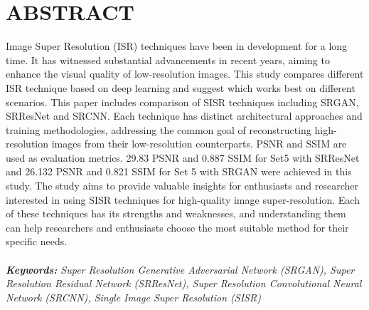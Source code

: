 \newpage

\section*{ABSTRACT}

Image Super Resolution (ISR) techniques have been in development for a long time. It has witnessed substantial advancements in recent years, aiming to enhance the visual quality of low-resolution images. This study compares different ISR technique based on deep learning and suggest which works best on different scenarios. This paper includes comparison of SISR techniques including SRGAN, SRResNet and SRCNN. Each technique has distinct architectural approaches and training methodologies, addressing the common goal of reconstructing high-resolution images from their low-resolution counterparts. PSNR and SSIM are used as evaluation metrics. 29.83 PSNR and 0.887 SSIM for Set5 with SRResNet and 26.132 PSNR and 0.821 SSIM for Set 5 with SRGAN were achieved in this study. The study aims to provide valuable insights for enthusiasts and researcher interested in using SISR techniques for high-quality image super-resolution. Each of these techniques has its strengths and weaknesses, and understanding them can help researchers and enthusiasts choose the most suitable method for their specific needs.
\\
\\
\textit {{\bf Keywords:}  Super Resolution Generative Adversarial Network (SRGAN), Super Resolution Residual Network (SRResNet), Super Resolution Convolutional Neural Network (SRCNN), Single Image Super Resolution (SISR) }